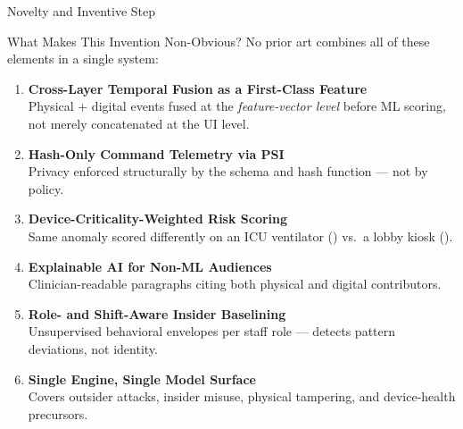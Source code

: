 \documentclass[10pt, aspectratio=169]{beamer}
\begin{document}
\begin{frame}{Novelty and Inventive Step}
  \begin{block}{What Makes This Invention Non-Obvious?}
    No prior art combines all of these elements in a single system:
  \end{block}
  \vspace{4pt}
  \begin{enumerate}\small
    \item \textbf{Cross-Layer Temporal Fusion as a First-Class Feature}\\
      {\footnotesize Physical + digital events fused at the \textit{feature-vector level} before ML scoring,
      not merely concatenated at the UI level.}
    \item \textbf{Hash-Only Command Telemetry via PSI}\\
      {\footnotesize Privacy enforced structurally by the schema and hash function — not by policy.}
    \item \textbf{Device-Criticality-Weighted Risk Scoring}\\
      {\footnotesize Same anomaly scored differently on an ICU ventilator () vs.\ a lobby kiosk ().}
    \item \textbf{Explainable AI for Non-ML Audiences}\\
      {\footnotesize Clinician-readable paragraphs citing both physical and digital contributors.}
    \item \textbf{Role- and Shift-Aware Insider Baselining}\\
      {\footnotesize Unsupervised behavioral envelopes per staff role — detects pattern deviations, not identity.}
    \item \textbf{Single Engine, Single Model Surface}\\
      {\footnotesize Covers outsider attacks, insider misuse, physical tampering, and device-health precursors.}
  \end{enumerate}
\end{frame}
\end{document}
